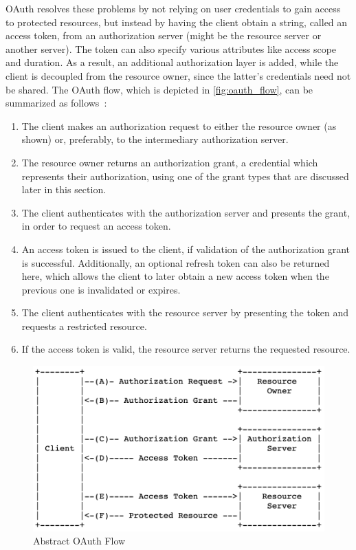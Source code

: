 OAuth resolves these problems by not relying on user credentials to gain access to protected resources, but instead by having the client obtain a string, called an access token, from an authorization server (might be the resource server or another server).  The token can also specify various attributes like access scope and duration. As a result, an additional authorization layer is added, while the client is decoupled from the resource owner, since the latter's credentials need not be shared. The OAuth flow, which is depicted in \autoref{fig:oauth_flow}, can be summarized as follows~\cite{oauth}:

\begin{enumerate} [(A.)]
    \item The client makes an authorization request to either the resource owner  (as shown) or, preferably, to the intermediary authorization server.

    \item The resource owner returns an authorization grant, a credential which represents their authorization, using one of the grant types that are discussed later in this section.

    \item The client authenticates with the authorization server and presents the grant, in order to request an access token.

    \item An access token is issued to the client, if validation of the authorization grant is successful. Additionally, an optional refresh token can also be returned here, which allows the client to later obtain a new access token when the previous one is invalidated or expires.

    \item  The client authenticates with the resource server by presenting the token and requests a restricted resource.

    \item If the access token is valid, the resource server returns the requested resource.
\end{enumerate}

\begin{figure} [h]
    \centering
    \includegraphics[scale=0.7]{images/oauth_flow}
    \caption{\label{fig:oauth_flow}Abstract OAuth Flow}
\end{figure}

